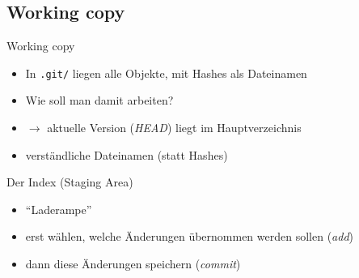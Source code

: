 \subsection{Working copy}
\begin{frame}{Working copy}
    \begin{itemize}
        \item In \texttt{.git/} liegen alle Objekte, mit Hashes als Dateinamen
        \item Wie soll man damit arbeiten?
        \item $\rightarrow$ aktuelle Version (\emph{HEAD}) liegt im Hauptverzeichnis
        \item verständliche Dateinamen (statt Hashes)
    \end{itemize}
\end{frame}

\begin{frame}{Der Index (Staging Area)}
    \begin{itemize}
        \item ``Laderampe''
        \item erst wählen, welche Änderungen übernommen werden sollen (\emph{add})
        \item dann diese Änderungen speichern (\emph{commit})
    \end{itemize}

\end{frame}

